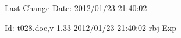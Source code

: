 Last Change $ $Date: 2012/01/23 21:40:02 $ $

$ $Id: t028.doc,v 1.33 2012/01/23 21:40:02 rbj Exp $ $
